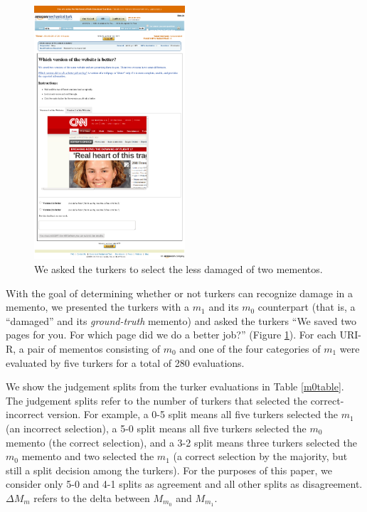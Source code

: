 \begin{figure}[h!]
\includegraphics[width=0.50\textwidth]{./imgs/turkss.png}
\caption{We asked the turkers to select the less damaged of two mementos.}
\label{turkss}
\end{figure}


With the goal of determining whether or not turkers can recognize damage in a memento, we presented the turkers with a $m_1$ and its $m_0$ counterpart (that is, a ``damaged'' and its \emph{ground-truth} memento) and asked the turkers ``We saved two pages for you. For which page did we do a better job?'' (Figure \ref{turkss}). For each URI-R, a pair of mementos consisting of $m_0$ and one of the four categories of $m_1$ were evaluated by five turkers for a total of 280 evaluations. 

We show the judgement splits from the turker evaluations in Table \ref{m0table}. The judgement splits refer to the number of turkers that selected the correct-incorrect version. For example, a 0-5 split means all five turkers selected the $m_1$ (an incorrect selection), a 5-0 split means all five turkers selected the $m_0$ memento (the correct selection), and a 3-2 split means three turkers selected the $m_0$ memento and two selected the $m_1$ (a correct selection by the majority, but still a split decision among the turkers). For the purposes of this paper, we consider only 5-0 and 4-1 splits as agreement and all other splits as disagreement. {$\Delta M_m$} refers to the delta between $M_{m_0}$ and $M_{m_1}$.

